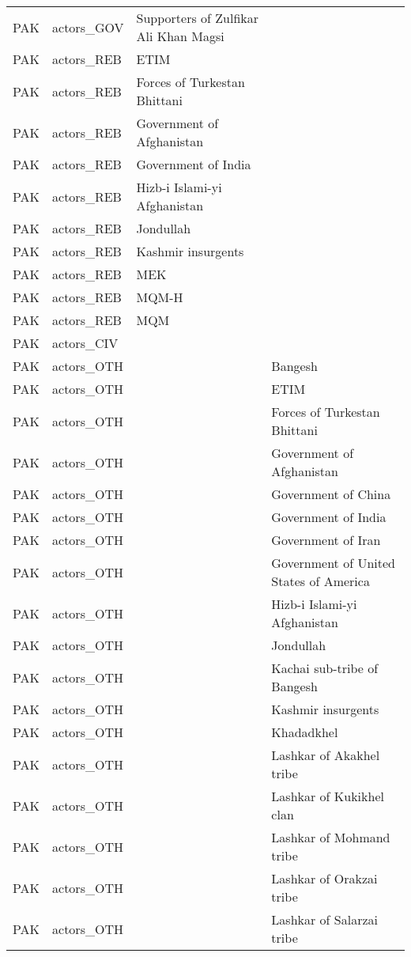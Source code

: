 \begin{table}[ht]
\begin{tabular}{llll}
  PAK & actors\_GOV & Supporters of Zulfikar Ali Khan Magsi &  \\ 
  PAK & actors\_REB & ETIM &  \\ 
  PAK & actors\_REB & Forces of Turkestan Bhittani &  \\ 
  PAK & actors\_REB & Government of Afghanistan &  \\ 
  PAK & actors\_REB & Government of India &  \\ 
  PAK & actors\_REB & Hizb-i Islami-yi Afghanistan &  \\ 
  PAK & actors\_REB & Jondullah &  \\ 
  PAK & actors\_REB & Kashmir insurgents &  \\ 
  PAK & actors\_REB & MEK &  \\ 
  PAK & actors\_REB & MQM-H &  \\ 
  PAK & actors\_REB & MQM &  \\ 
  PAK & actors\_CIV &  &  \\ 
  PAK & actors\_OTH &  & Bangesh \\ 
  PAK & actors\_OTH &  & ETIM \\ 
  PAK & actors\_OTH &  & Forces of Turkestan Bhittani \\ 
  PAK & actors\_OTH &  & Government of Afghanistan \\ 
  PAK & actors\_OTH &  & Government of China \\ 
  PAK & actors\_OTH &  & Government of India \\ 
  PAK & actors\_OTH &  & Government of Iran \\ 
  PAK & actors\_OTH &  & Government of United States of America \\ 
  PAK & actors\_OTH &  & Hizb-i Islami-yi Afghanistan \\ 
  PAK & actors\_OTH &  & Jondullah \\ 
  PAK & actors\_OTH &  & Kachai sub-tribe of Bangesh \\ 
  PAK & actors\_OTH &  & Kashmir insurgents \\ 
  PAK & actors\_OTH &  & Khadadkhel \\ 
  PAK & actors\_OTH &  & Lashkar of Akakhel tribe \\ 
  PAK & actors\_OTH &  & Lashkar of Kukikhel clan \\ 
  PAK & actors\_OTH &  & Lashkar of Mohmand tribe \\ 
  PAK & actors\_OTH &  & Lashkar of Orakzai tribe \\ 
  PAK & actors\_OTH &  & Lashkar of Salarzai tribe \\ 

\end{tabular}
\end{table}
